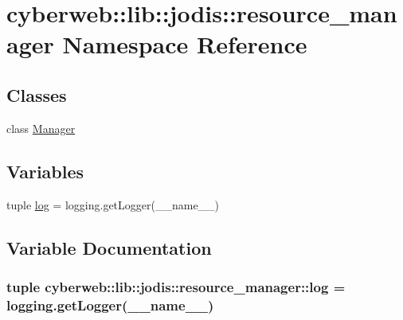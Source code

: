 \hypertarget{namespacecyberweb_1_1lib_1_1jodis_1_1resource__manager}{\section{cyberweb\-:\-:lib\-:\-:jodis\-:\-:resource\-\_\-manager \-Namespace \-Reference}
\label{namespacecyberweb_1_1lib_1_1jodis_1_1resource__manager}
}
\subsection*{\-Classes}
\begin{DoxyCompactItemize}
\item 
class \hyperlink{classcyberweb_1_1lib_1_1jodis_1_1resource__manager_1_1_manager}{\-Manager}
\end{DoxyCompactItemize}
\subsection*{\-Variables}
\begin{DoxyCompactItemize}
\item 
tuple \hyperlink{namespacecyberweb_1_1lib_1_1jodis_1_1resource__manager_a72281c2439a9a036359a1c826fee3384}{log} = logging.\-get\-Logger(\-\_\-\-\_\-name\-\_\-\-\_\-)
\end{DoxyCompactItemize}


\subsection{\-Variable \-Documentation}
\hypertarget{namespacecyberweb_1_1lib_1_1jodis_1_1resource__manager_a72281c2439a9a036359a1c826fee3384}{
\subsubsection[{log}]{\setlength{\rightskip}{0pt plus 5cm}tuple {\bf cyberweb\-::lib\-::jodis\-::resource\-\_\-manager\-::log} = logging.\-get\-Logger(\-\_\-\-\_\-name\-\_\-\-\_\-)}}\label{namespacecyberweb_1_1lib_1_1jodis_1_1resource__manager_a72281c2439a9a036359a1c826fee3384}
